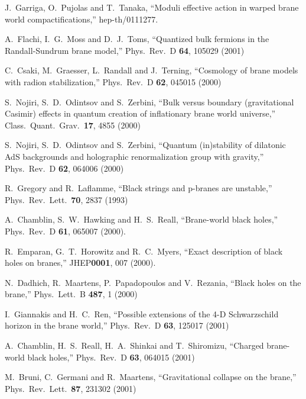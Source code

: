 \documentclass[a4paper,showpacs,preprintnumbers,amsmath,amssymb]{revtex4}
\begin{document}
\begin{thebibliography}{99}
J.~Garriga, O.~Pujolas and T.~Tanaka,
 ``Moduli effective action in warped brane world compactifications,'' hep-th/0111277.

 
A.~Flachi, I.~G.~Moss and D.~J.~Toms,
 ``Quantized bulk fermions in the Randall-Sundrum brane model,''
Phys.\ Rev.\ D {\bf 64}, 105029 (2001)
 
   
 
C.~Csaki, M.~Graesser, L.~Randall and J.~Terning,
 ``Cosmology of brane models with radion stabilization,''
Phys.\ Rev.\ D {\bf 62}, 045015 (2000)

 
S.~Nojiri, S.~D.~Odintsov and S.~Zerbini,
 ``Bulk versus boundary (gravitational Casimir) effects in quantum  creation of inflationary brane world universe,''
Class.\ Quant.\ Grav.\  {\bf 17}, 4855 (2000)
 
 
 
S.~Nojiri, S.~D.~Odintsov and S.~Zerbini,
 ``Quantum (in)stability of dilatonic AdS backgrounds and holographic  renormalization group with gravity,''
Phys.\ Rev.\ D {\bf 62}, 064006 (2000)
 


 





R.~Gregory and R.~Laflamme,
 ``Black strings and p-branes are unstable,''
Phys.\ Rev.\ Lett.\  {\bf 70}, 2837 (1993)
  

A.~Chamblin, S.~W.~Hawking and H.~S.~Reall,
 ``Brane-world black holes,''
Phys.\ Rev.\ D {\bf 61}, 065007 (2000).
 
 
R.~Emparan, G.~T.~Horowitz and R.~C.~Myers,
 ``Exact description of black holes on branes,''
JHEP{\bf 0001}, 007 (2000).
    
  
N.~Dadhich, R.~Maartens, P.~Papadopoulos and V.~Rezania,
 ``Black holes on the brane,''
Phys.\ Lett.\ B {\bf 487}, 1 (2000)
 
 
I.~Giannakis and H.~C.~Ren,
 ``Possible extensions of the 4-D Schwarzschild horizon in the brane  world,''
Phys.\ Rev.\ D {\bf 63}, 125017 (2001)
  
 
A.~Chamblin, H.~S.~Reall, H.~A.~Shinkai and T.~Shiromizu,
 ``Charged brane-world black holes,''
Phys.\ Rev.\ D {\bf 63}, 064015 (2001)
  
M.~Bruni, C.~Germani and R.~Maartens,
 ``Gravitational collapse on the brane,''
Phys.\ Rev.\ Lett.\  {\bf 87}, 231302 (2001)


\end{thebibliography}
\end{document}

